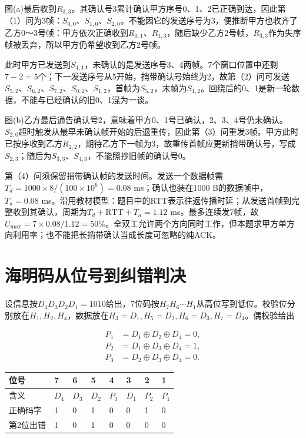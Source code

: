 图(a)最后收到\(R_{3,3}\)。其确认号3累计确认甲方序号0、1、2已正确到达，因此第（1）问为3帧：\(S_{0,0}\)、\(S_{1,0}\)、\(S_{2,0}\)。不能因它的发送序号为3，便推断甲方也收齐了乙方0～3号帧：甲方依次正确收到\(R_{0,1}\)、\(R_{1,3}\)，随后缺少乙方2号帧，\(R_{3,3}\)作为失序帧被丢弃，所以甲方仍希望收到乙方2号帧。

此时甲方已发送到\(S_{4,1}\)，未确认的是发送序号3、4两帧。7个窗口位置中还剩\(7-2=5\)个；下一发送序号从5开始，捎带确认号始终为2，故第（2）问可发送\(S_{5,2}\)、\(S_{6,2}\)、\(S_{7,2}\)、\(S_{0,2}\)、\(S_{1,2}\)，首帧为\(S_{5,2}\)，末帧为\(S_{1,2}\)。回绕后的0、1是新一轮数据，不能与已经确认的旧0、1混为一谈。

图(b)乙方最后通告确认号2，意味着甲方0、1号已确认，2、3、4号仍未确认。\(S_{2,0}\)超时触发从最早未确认帧开始的后退重传，因此第（3）问重发3帧。甲方此时已按序收到乙方\(R_{2,2}\)，期待乙方下一帧为3，故重传首帧应更新捎带确认号，写成\(S_{2,3}\)；随后为\(S_{3,3}\)、\(S_{4,3}\)，不能照抄旧帧的确认号0。

第（4）问须保留捎带确认帧的发送时间。发送一个数据帧需\(T_d=1000\times8/(100\times10^6)=0.08\) ms；确认也装在1000 B的数据帧中，\(T_a=0.08\) ms。沿用教材模型：题目中的RTT表示往返传播时延；从发送首帧到完整收到其确认，周期为\(T_d+\mathrm{RTT}+T_a=1.12\) ms。最多连续发7帧，故\(U_{\max}=7\times0.08/1.12=50\%\)。全双工允许两个方向同时工作，但本题求甲方单方向利用率；也不能把长捎带确认当成长度可忽略的纯ACK。

\section{海明码从位号到纠错判决}\label{CN03-course-hamming}

设信息按\(D_4D_3D_2D_1=1010\)给出，7位码按\(H_7H_6\cdots H_1\)从高位写到低位。校验位分别放在\(H_1,H_2,H_4\)，数据放在\(H_3=D_1,H_5=D_2,H_6=D_3,H_7=D_4\)。偶校验给出

\[\begin{aligned}
P_1&=D_1\oplus D_2\oplus D_4=0,\\
P_2&=D_1\oplus D_3\oplus D_4=1,\\
P_3&=D_2\oplus D_3\oplus D_4=0.
\end{aligned}\]

\begin{wideblock}

\par\medskip\noindent\begin{minipage}{\linewidth}\fontsize{9.3}{12}\selectfont\begin{tabularx}{\linewidth}{@{}YYYYYYYY@{}}
\toprule\noalign{}
位号 & 7 & 6 & 5 & 4 & 3 & 2 & 1 \\
\midrule\noalign{}


含义 & \(D_4\) & \(D_3\) & \(D_2\) & \(P_3\) & \(D_1\) & \(P_2\) & \(P_1\) \\
正确码字 & 1 & 0 & 1 & 0 & 0 & 1 & 0 \\
第2位出错 & 1 & 0 & 1 & 0 & 0 & 0 & 0 \\
\bottomrule\end{tabularx}
\end{minipage}\par\medskip

\end{wideblock}

